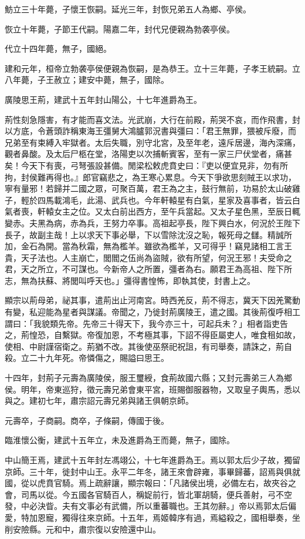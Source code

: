 \begin{pinyinscope}
魴立三十年薨，子懷王恢嗣。延光三年，封恢兄弟五人為鄉、亭侯。

恢立十年薨，子節王代嗣。陽嘉二年，封代兄便親為勃袭亭侯。

代立十四年薨，無子，國絕。

建和元年，桓帝立勃袭亭侯便親為恢嗣，是為恭王。立十三年薨，子孝王統嗣。立八年薨，子王赦立；建安中薨，無子，國除。

廣陵思王荊，建武十五年封山陽公，十七年進爵為王。

荊性刻急隱害，有才能而喜文法。光武崩，大行在前殿，荊哭不哀，而作飛書，封以方底，令蒼頭詐稱東海王彊舅大鴻臚郭況書與彊曰：「君王無罪，猥被斥廢，而兄弟至有束縛入牢獄者。太后失職，別守北宮，及至年老，遠斥居邊，海內深痛，觀者鼻酸。及太后尸柩在堂，洛陽吏以次捕斬賓客，至有一家三尸伏堂者，痛甚矣！今天下有喪，弓弩張設甚備。閒梁松敕虎賁史曰：『吏以便宜見非，勿有所拘，封侯難再得也。』郎官竊悲之，為王寒心累息。今天下爭欲思刻賊王以求功，寧有量邪！若歸并二國之眾，可聚百萬，君王為之主，鼓行無前，功易於太山破雞子，輕於四馬載鴻毛，此湯、武兵也。今年軒轅星有白氣，星家及喜事者，皆云白氣者喪，軒轅女主之位。又太白前出西方，至午兵當起。又太子星色黑，至辰日輒變赤。夫黑為病，赤為兵，王努力卒事。高祖起亭長，陛下興白水，何況於王陛下長子，故副主哉！上以求天下事必舉，下以雪除沈沒之恥，報死母之讎。精誠所加，金石為開。當為秋霜，無為檻羊。雖欲為檻羊，又可得乎！竊見諸相工言王貴，天子法也。人主崩亡，閭閻之伍尚為盜賊，欲有所望，何況王邪！夫受命之君，天之所立，不可謀也。今新帝人之所置，彊者為右。願君王為高祖、陛下所志，無為扶蘇、將閭叫呼天也。」彊得書惶怖，即執其使，封書上之。

顯宗以荊母弟，祕其事，遣荊出止河南宮。時西羌反，荊不得志，冀天下因羌驚動有變，私迎能為星者與謀議。帝聞之，乃徙封荊廣陵王，遣之國。其後荊復呼相工謂曰：「我貌類先帝。先帝三十得天下，我今亦三十，可起兵未？」相者詣吏告之，荊惶恐，自繫獄。帝復加恩，不考極其事，下詔不得臣屬吏人，唯食租如故，使相、中尉謹宿衛之。荊猶不改。其後使巫祭祀祝詛，有司舉奏，請誅之，荊自殺。立二十九年死。帝憐傷之，賜謚曰思王。

十四年，封荊子元壽為廣陵侯，服王璽綬，食荊故國六縣；又封元壽弟三人為鄉侯。明年，帝東巡狩，徵元壽兄弟會東平宮，班賜御服器物，又取皇子輿馬，悉以與之。建初七年，肅宗詔元壽兄弟與諸王俱朝京師。

元壽卒，子商嗣。商卒，子條嗣，傳國于後。

臨淮懷公衡，建武十五年立，未及進爵為王而薨，無子，國除。

中山簡王焉，建武十五年封左馮翊公，十七年進爵為王。焉以郭太后少子故，獨留京師。三十年，徙封中山王。永平二年冬，諸王來會辟雍，事畢歸蕃，詔焉與俱就國，從以虎賁官騎。焉上疏辭讓，顯宗報曰：「凡諸侯出境，必備左右，故夾谷之會，司馬以從。今五國各官騎百人，稱娖前行，皆北軍胡騎，便兵善射，弓不空發，中必決眥。夫有文事必有武備，所以重蕃職也。王其勿辭。」帝以焉郭太后偏愛，特加恩寵，獨得往來京師。十五年，焉姬韓序有過，焉縊殺之，國相舉奏，坐削安險縣。元和中，肅宗復以安險還中山。


\end{pinyinscope}
